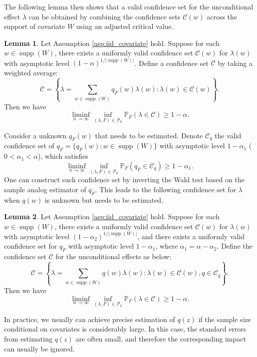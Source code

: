 \documentclass[11pt]{article}
\theoremstyle{definition}
\newtheorem{lemma}{Lemma}[section]
\DeclareMathOperator*{\supp}{supp}
\newcommand{\Prob}{\ensuremath{\mathbb{P}}} %
\newcommand{\0}{\ensuremath{\mathbf{0}}}
\begin{document}
\begin{bibunit}
The following lemma then shows that a valid confidence set for the unconditional effect $\lambda$ can be obtained by combining the confidence sets ${\mathcal{C}}(w)$ across the support of covariate $W$ using an adjusted critical value.
\begin{lemma}
\label{lem:inference_covariates}
Let Assumption \ref{asp:iid_covariate} hold. Suppose for each $w \in \supp(W)$, there exists a uniformly valid confidence set ${\mathcal{C}}(w)$ for $\lambda(w)$ with asymptotic level $(1-\alpha)^{1/|\supp(W)|}$. Define a confidence set ${\mathcal{C}}$ by taking a weighted average:
\[
	{\mathcal{C}} = \left\{\lambda = \sum_{w\in\supp(W)}q_F(w)\lambda(w): \lambda(w) \in {\mathcal{C}}(w)\right\}.
\]
Then we have
\[
	\liminf_{n\to\infty} \inf_{(\lambda, F)\in \mathcal{P}_0} \Prob_F\left(\lambda \in {\mathcal{C}} \right) \geq 1-\alpha.
\]
\end{lemma}

Consider a unknown $q_F(w)$ that needs to be estimated. Denote ${\mathcal{C}}_q$ the valid confidence set of $q_F = \{q_F(w): w\in\supp(W)\}$ with asymptotic level $1-\alpha_1$ ($0<\alpha_1<\alpha$), which satisfies
\[
	\liminf_{n\to\infty} \inf_{(\lambda, F) \in \mathcal{P}_0} \Prob_F\left(q_F \in {\mathcal{C}}_q\right) \geq 1-\alpha_1.
\]
One can construct such confidence set by inverting the Wald test based on the sample analog estimator of $q_F$. This leads to the following confidence set for $\lambda$ when $q(w)$ is unknown but needs to be estimated.

\begin{lemma}
\label{lem:inference_covariates_estimated_mass}
Let Assumption \ref{asp:iid_covariate} hold. Suppose for each $w \in \supp(W)$, there exists a uniformly valid confidence set ${\mathcal{C}}(w)$ for $\lambda(w)$ with asymptotic level $(1-\alpha_2)^{1/|\supp(W)|}$, and there exists a uniformly valid confidence set for $q_F$ with asymptotic level $1-\alpha_1$, where $\alpha_1 = \alpha - \alpha_2$. Define the confidence set $\mathcal{C}$ for the unconditional effects as below:
\[
	{\mathcal{C}} = \left\{\lambda = \sum_{w\in\supp(W)}q(w)\lambda(w): \lambda(w) \in {\mathcal{C}}(w), q \in {\mathcal{C}}_q\right\}.
\]
Then we have 
\[
	\liminf_{n\to\infty} \inf_{(\lambda, F)\in \mathcal{P}_0} \Prob_F\left(\lambda \in {\mathcal{C}} \right) \geq 1-\alpha.
\]
\end{lemma}

In practice, we usually can achieve precise estimation of $q(z)$ if the sample size conditional on covariates is considerably large. In this case, the standard errors from estimating $q(z)$ are often small, and therefore the corresponding impact can usually be ignored.



\end{bibunit}
\end{document}
